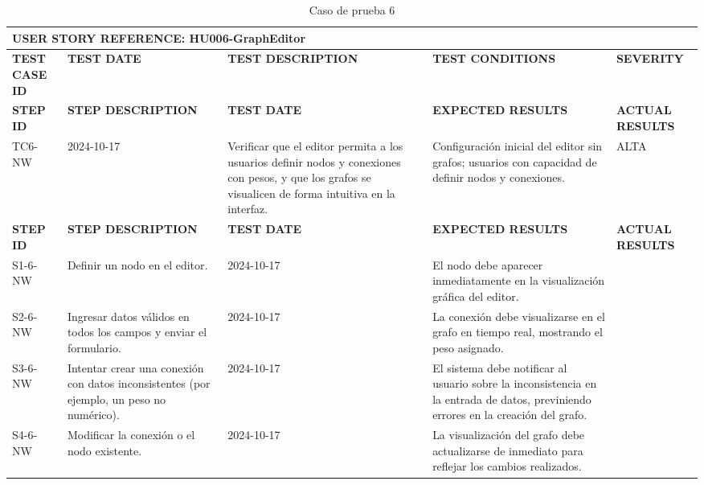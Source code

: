 \documentclass[stu, 12pt, letterpaper, donotrepeattitle, floatsintext, natbib]{apa7}
\begin{document}
\begin{longtable}{|p{2cm}|p{3cm}|p{3cm}|p{3cm}|p{3cm}|}
    \caption{Caso de prueba 6} \label{tab:casos_prueba6} \\
    \hline
    \multicolumn{5}{|l|}{\textbf{USER STORY REFERENCE: HU006-GraphEditor}} \\ \hline
    \textbf{TEST CASE ID} & \textbf{TEST DATE} & \textbf{TEST DESCRIPTION} & \textbf{TEST CONDITIONS} & \textbf{SEVERITY} \\ \hline
    \endfirsthead
    \hline
    \textbf{STEP ID} & \textbf{STEP DESCRIPTION} & \textbf{TEST DATE} & \textbf{EXPECTED RESULTS} & \textbf{ACTUAL RESULTS} \\ \hline
    \endhead
    TC6-NW & 2024-10-17 & Verificar que el editor permita a los usuarios definir nodos y conexiones con pesos, y que los grafos se visualicen de forma intuitiva en la interfaz. & Configuración inicial del editor sin grafos; usuarios con capacidad de definir nodos y conexiones. & ALTA \\ \hline
    \textbf{STEP ID} & \textbf{STEP DESCRIPTION} & \textbf{TEST DATE} & \textbf{EXPECTED RESULTS} & \textbf{ACTUAL RESULTS} \\ \hline
    S1-6-NW & Definir un nodo en el editor. & 2024-10-17 & El nodo debe aparecer inmediatamente en la visualización gráfica del editor. & \\ \hline
    S2-6-NW & Ingresar datos válidos en todos los campos y enviar el formulario. & 2024-10-17 & La conexión debe visualizarse en el grafo en tiempo real, mostrando el peso asignado. & \\ \hline
    S3-6-NW & Intentar crear una conexión con datos inconsistentes (por ejemplo, un peso no numérico). & 2024-10-17 & El sistema debe notificar al usuario sobre la inconsistencia en la entrada de datos, previniendo errores en la creación del grafo. & \\ \hline
    S4-6-NW & Modificar la conexión o el nodo existente. & 2024-10-17 & La visualización del grafo debe actualizarse de inmediato para reflejar los cambios realizados. & \\ \hline
\end{longtable}

\small %
\renewcommand{\arraystretch}{1.0} %
\setlength{\tabcolsep}{4pt} %
\end{document}
